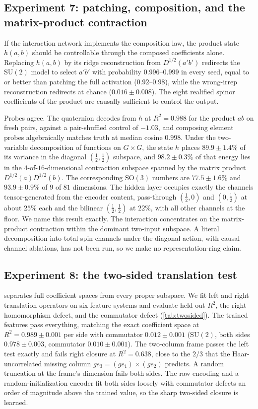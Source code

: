 \documentclass{article}
\newcommand{\SU}{\mathrm{SU}}
\newcommand{\SO}{\mathrm{SO}}
\begin{document}
\subsection{Experiment 7: patching, composition, and the
matrix-product contraction}

If the interaction network implements the composition law, the
product state $h(a,b)$ should be controllable through the composed
coefficients alone. Replacing $h(a,b)$ by its ridge reconstruction
from $D^{1/2}(a'b')$ redirects the $\SU(2)$ model to select $a'b'$
with probability $0.996$--$0.999$ in every seed, equal to or better
than patching the full activation ($0.92$--$0.98$), while the
wrong-irrep reconstruction redirects at chance ($0.016 \pm 0.008$).
The eight realified spinor coefficients of the product are causally
sufficient to control the output.

Probes agree. The quaternion decodes from $h$ at $R^2 = 0.988$ for
the product $ab$ on fresh pairs, against a pair-shuffled control of
$-1.03$, and composing element probes algebraically matches truth at
median cosine $0.998$. Under the two-variable decomposition of
functions on $G \times G$, the state $h$ places $89.9 \pm 1.4\%$ of
its variance in the diagonal $(\tfrac12, \tfrac12)$ subspace, and
$98.2 \pm 0.3\%$ of that energy lies in the $4$-of-$16$-dimensional
contraction subspace spanned by the matrix product
$D^{1/2}(a) D^{1/2}(b)$. The corresponding $\SO(3)$ numbers are
$77.5 \pm 1.6\%$ and $93.9 \pm 0.9\%$ of $9$ of $81$ dimensions. The hidden layer occupies exactly the channels tensor-generated from the
encoder content, pass-through $(\tfrac12, 0)$ and $(0, \tfrac12)$ at
about $25\%$ each and the bilinear $(\tfrac12, \tfrac12)$ at $22\%$,
with all other channels at the floor. We name this result exactly. The
interaction concentrates on the matrix-product contraction within the
dominant two-input subspace. A literal decomposition into total-spin
channels under the diagonal action, with causal channel ablations, has
not been run, so we make no representation-ring claim.

\subsection{Experiment 8: the two-sided translation test}

 separates full coefficient spaces from every
proper subspace. We fit left and right translation operators on six
feature systems and evaluate held-out $R^2$, the right-homomorphism
defect, and the commutator defect (\cref{tab:twosided}). The trained
features pass everything, matching the exact coefficient space at
$R^2 = 0.989 \pm 0.001$ per side with commutator $0.012 \pm 0.001$
($\SU(2)$, both sides $0.978 \pm 0.003$, commutator
$0.010 \pm 0.001$). The two-column frame passes the left test exactly
and fails right closure at $R^2 = 0.638$, close to the $2/3$ that the
Haar-uncorrelated missing column $g e_3 = (g e_1) \times (g e_2)$
predicts. A random truncation at the frame's dimension fails both
sides. The raw encoding and a random-initialization encoder fit both
sides loosely with commutator defects an order of magnitude above the
trained value, so the sharp two-sided closure is learned.
\end{document}
